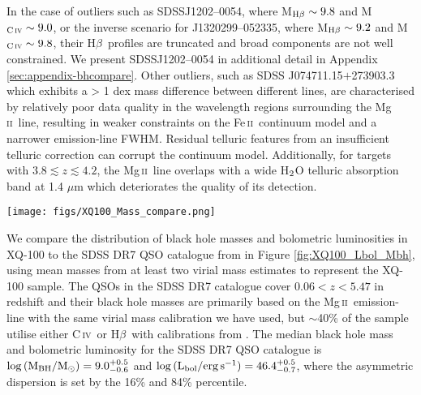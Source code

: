 \documentclass[fleqn,usenatbib]{mnras}
\newcommand{\mgii}{Mg\,\textsc{ii}}
\newcommand{\civ}{C\,\textsc{iv}}
\newcommand{\feii}{Fe\,\textsc{ii}}
\newcommand{\hbeta}{H\textsc{$\beta$}}
\begin{document}
In the case of outliers such as SDSSJ1202--0054, where M$_{\rm{\hbeta}} \sim 9.8$ and M$_{\rm{\civ}} \sim 9.0$, or the inverse scenario for J1320299--052335, where M$_{\rm{\hbeta}} \sim 9.2$ and M$_{\rm{\civ}} \sim 9.8$, their \hbeta\ profiles are truncated and broad components are not well constrained. We present SDSSJ1202--0054 in additional detail in Appendix \ref{sec:appendix-bhcompare}. Other outliers, such as SDSS J074711.15$+$273903.3 which exhibits a > 1 dex mass difference between different lines, are characterised by relatively poor data quality in the wavelength regions surrounding the \mgii\ line, resulting in weaker constraints on the \feii\ continuum model and a narrower emission-line FWHM. Residual telluric features from an insufficient telluric correction can corrupt the continuum model. Additionally, for targets with $3.8 \lesssim z \lesssim 4.2$, the \mgii\ line overlaps with a wide H$_{\rm{2}}$O telluric absorption band at 1.4 $\mu$m which deteriorates the quality of its detection.


\begin{figure*}
	\texttt{[image: figs/XQ100\_Mass\_compare.png]}
    \caption{Comparison of virial black hole masses based on \mgii, \civ, and \hbeta\ relations in Table \ref{tab:virial_relations}. The blue shaded contours represent the two-dimensional continuous probability density distribution calculated with a kernel density estimator \citep{Waskom2021_seaborn}. Each subsequent contour level marks density iso-proportions increasing by an additional 10\% up to 90\% enclosed. The red error bars plotted on the top left of each plot show the extent of the 0.5 dex uncertainty, which is a conservative estimate of the uncertainty inherent in the virial mass estimation method. Comparisons between all three virial mass estimates are scatted around the 1:1 relation, indicated by the black dashed line. The mean and standard deviation listed in the top-left of each panel are based on the residual from the mass measure on the y-axis subtracted by the mass measure on the x-axis.}
    \label{fig:mass_compare}
\end{figure*}

We compare the distribution of black hole masses and bolometric luminosities in XQ-100 to the SDSS DR7 QSO catalogue from \citet{Shen_2011} in Figure \ref{fig:XQ100_Lbol_Mbh}, using mean masses from at least two virial mass estimates to represent the XQ-100 sample. The QSOs in the SDSS DR7 catalogue cover $0.06 < z < 5.47$ in redshift and their black hole masses are primarily based on the \mgii\ emission-line with the same virial mass calibration we have used, but $\sim$40\% of the sample utilise either \civ\ or \hbeta\ with calibrations from \citet{Vestergaard_2006}. The median black hole mass and bolometric luminosity for the SDSS DR7 QSO catalogue is $\log{(\rm{M_{BH}}/\rm{M_\odot})} = 9.0^{+0.5}_{-0.6}$ and $\log{(\rm{L_{bol}}/\rm{erg\,s^{-1}})} = 46.4^{+0.5}_{-0.7}$, where the asymmetric dispersion is set by the 16\% and 84\% percentile.
\end{document}
